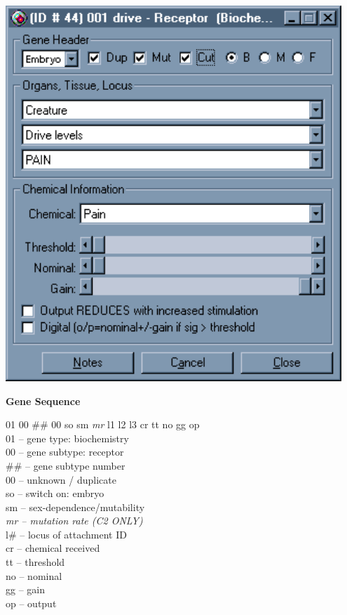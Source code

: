 \documentclass[11pt,twoside,a4paper]{article}
\begin{document}
\begin{minipage}[ht]{0.40\textwidth}
	\includegraphics[width=0.95\textwidth]{img/gen10k.png}
\end{minipage} \hfill \begin{minipage}[ht]{0.575\textwidth}
	\textbf{\large Gene Sequence} %
	
	01 00 \#\# 00 so sm \emph{mr} l1 l2 l3 cr tt no gg op ~\\

	01 -- gene type: biochemistry ~\\
	00 -- gene subtype: receptor ~\\
	\#\# -- gene subtype number ~\\
	00 -- unknown / duplicate ~\\
	so -- switch on: embryo ~\\
	sm -- sex-dependence/mutability ~\\
	\emph{mr -- mutation rate (C2 ONLY)} ~\\
	l\# -- locus of attachment ID ~\\
	cr -- chemical received ~\\
	tt -- threshold ~\\
	no -- nominal ~\\
	gg -- gain ~\\
	op -- output~\\
\end{minipage} ~\\
\end{document}
